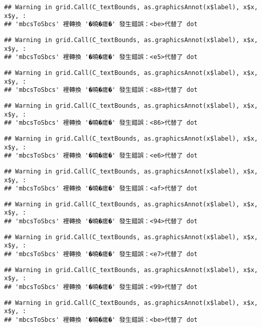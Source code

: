 \documentclass[
]{article}
\begin{document}
\begin{verbatim}
## Warning in grid.Call(C_textBounds, as.graphicsAnnot(x$label), x$x, x$y, :
## 'mbcsToSbcs' 裡轉換 '�曉�瘥�' 發生錯誤：<be>代替了 dot
\end{verbatim}

\begin{verbatim}
## Warning in grid.Call(C_textBounds, as.graphicsAnnot(x$label), x$x, x$y, :
## 'mbcsToSbcs' 裡轉換 '�曉�瘥�' 發生錯誤：<e5>代替了 dot
\end{verbatim}

\begin{verbatim}
## Warning in grid.Call(C_textBounds, as.graphicsAnnot(x$label), x$x, x$y, :
## 'mbcsToSbcs' 裡轉換 '�曉�瘥�' 發生錯誤：<88>代替了 dot
\end{verbatim}

\begin{verbatim}
## Warning in grid.Call(C_textBounds, as.graphicsAnnot(x$label), x$x, x$y, :
## 'mbcsToSbcs' 裡轉換 '�曉�瘥�' 發生錯誤：<86>代替了 dot
\end{verbatim}

\begin{verbatim}
## Warning in grid.Call(C_textBounds, as.graphicsAnnot(x$label), x$x, x$y, :
## 'mbcsToSbcs' 裡轉換 '�曉�瘥�' 發生錯誤：<e6>代替了 dot
\end{verbatim}

\begin{verbatim}
## Warning in grid.Call(C_textBounds, as.graphicsAnnot(x$label), x$x, x$y, :
## 'mbcsToSbcs' 裡轉換 '�曉�瘥�' 發生錯誤：<af>代替了 dot
\end{verbatim}

\begin{verbatim}
## Warning in grid.Call(C_textBounds, as.graphicsAnnot(x$label), x$x, x$y, :
## 'mbcsToSbcs' 裡轉換 '�曉�瘥�' 發生錯誤：<94>代替了 dot
\end{verbatim}

\begin{verbatim}
## Warning in grid.Call(C_textBounds, as.graphicsAnnot(x$label), x$x, x$y, :
## 'mbcsToSbcs' 裡轉換 '�曉�瘥�' 發生錯誤：<e7>代替了 dot
\end{verbatim}

\begin{verbatim}
## Warning in grid.Call(C_textBounds, as.graphicsAnnot(x$label), x$x, x$y, :
## 'mbcsToSbcs' 裡轉換 '�曉�瘥�' 發生錯誤：<99>代替了 dot
\end{verbatim}

\begin{verbatim}
## Warning in grid.Call(C_textBounds, as.graphicsAnnot(x$label), x$x, x$y, :
## 'mbcsToSbcs' 裡轉換 '�曉�瘥�' 發生錯誤：<be>代替了 dot
\end{verbatim}
\end{document}
